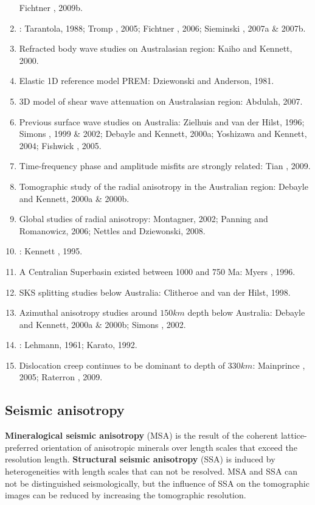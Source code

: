 \begin{enumerate}[\hspace{10mm}*]
    Fichtner \etal, 2009b.
  \item {}: Tarantola, 1988; Tromp \etal, 2005; Fichtner \etal, 2006;
    Sieminski \etal, 2007a \& 2007b.
  \item Refracted body wave studies on Australasian region: Kaiho and Kennett, 2000.
  \item Elastic 1D reference model PREM: Dziewonski and Anderson, 1981.
  \item 3D model of shear wave attenuation on Australasian region: Abdulah, 2007.
  \item Previous surface wave studies on Australia: Zielhuis and van der Hilst, 1996;
    Simons \etal, 1999 \& 2002; Debayle and Kennett, 2000a; Yoshizawa and Kennett, 2004;
    Fishwick \etal, 2005. 
  \item Time-frequency phase and amplitude misfits are strongly related: Tian \etal, 2009.
  \item Tomographic study of the radial anisotropy in the Australian region:
    Debayle and Kennett, 2000a \& 2000b.
  \item Global studies of radial anisotropy: Montagner, 2002; Panning and Romanowicz, 2006;
    Nettles and Dziewonski, 2008.
  \item {}
    :
    Kennett \etal, 1995.
  \item A Centralian Superbasin existed between 1000 and 750 Ma: Myers \etal, 1996.
  \item SKS splitting studies below Australia: Clitheroe and van der Hilst, 1998.
  \item Azimuthal anisotropy studies around $150km$ depth below Australia:
    Debayle and Kennett, 2000a \& 2000b; Simons \etal, 2002.
  \item {}: Lehmann, 1961; Karato, 1992.
  \item Dislocation creep continues to be dominant to depth of $330km$:
    Mainprince \etal, 2005; Raterron \etal, 2009.
\end{enumerate}

\subsection{Seismic anisotropy}
\textbf{Mineralogical seismic anisotropy} (MSA)
is the result of the coherent lattice-preferred orientation of anisotropic minerals
over length scales that exceed the resolution length.
\textbf{Structural seismic anisotropy} (SSA)
is induced by heterogeneities with length scales that can not be resolved.
MSA and SSA can not be distinguished seismologically,
but the influence of SSA on the tomographic images can be reduced
by increasing the tomographic resolution.


